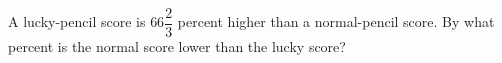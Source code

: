 A lucky-pencil score is $66\dfrac{2}{3}$ percent higher than a normal-pencil score. By what percent is the normal score lower than the lucky score?
